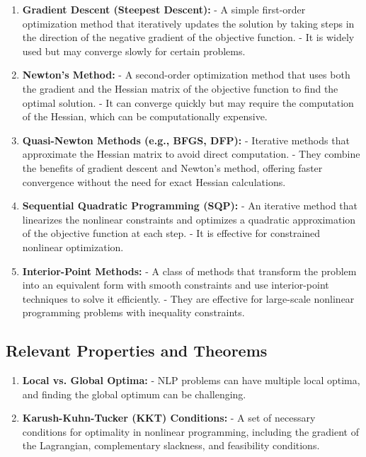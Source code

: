 \documentclass[a4paper]{article}
\begin{document}
\begin{enumerate}
\item \textbf{Gradient Descent (Steepest Descent):}
   - A simple first-order optimization method that iteratively updates the solution by taking steps in the direction of the negative gradient of the objective function.
   - It is widely used but may converge slowly for certain problems.

\item \textbf{Newton's Method:}
   - A second-order optimization method that uses both the gradient and the Hessian matrix of the objective function to find the optimal solution.
   - It can converge quickly but may require the computation of the Hessian, which can be computationally expensive.

\item \textbf{Quasi-Newton Methods (e.g., BFGS, DFP):}
   - Iterative methods that approximate the Hessian matrix to avoid direct computation.
   - They combine the benefits of gradient descent and Newton's method, offering faster convergence without the need for exact Hessian calculations.

\item \textbf{Sequential Quadratic Programming (SQP):}
   - An iterative method that linearizes the nonlinear constraints and optimizes a quadratic approximation of the objective function at each step.
   - It is effective for constrained nonlinear optimization.

\item \textbf{Interior-Point Methods:}
   - A class of methods that transform the problem into an equivalent form with smooth constraints and use interior-point techniques to solve it efficiently.
   - They are effective for large-scale nonlinear programming problems with inequality constraints.
\end{enumerate}

\subsection{Relevant Properties and Theorems}

\begin{enumerate}
\item \textbf{Local vs. Global Optima:}
   - NLP problems can have multiple local optima, and finding the global optimum can be challenging.
   
\item \textbf{Karush-Kuhn-Tucker (KKT) Conditions:}
   - A set of necessary conditions for optimality in nonlinear programming, including the gradient of the Lagrangian, complementary slackness, and feasibility conditions.
\end{enumerate}
\end{document}
